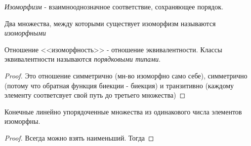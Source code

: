 
\begin{definition} \thmslashn

	\textit{Изоморфизм} - взаимнооднозначное соответствие, сохраняющее порядок.
	
	Два множества, между которыми существует изоморфизм называются \textit{изоморфными}
\end{definition}

\begin{lemma} \thmslashn

	Отношение <<изоморфность>> - отношение эквивалентности. Классы эквивалентности называются \textit{порядковыми типами}.
	\begin{proof} \thmslashn
		
		Это отношение симметрично (мн-во изоморфно само себе), симметрично (потому что обратная функция биекции - биекция) и транзитивно (каждому элементу соответсвует свой путь до третьего множества)
	\end{proof}
\end{lemma}

\begin{theorem} \thmslashn

	Конечные линейно упорядоченные множества из одинакового числа элементов изоморфны.
	\begin{proof} \thmslashn
	
		Всегда можно взять наименьший. Тогда 
	\end{proof}
\end{theorem}

